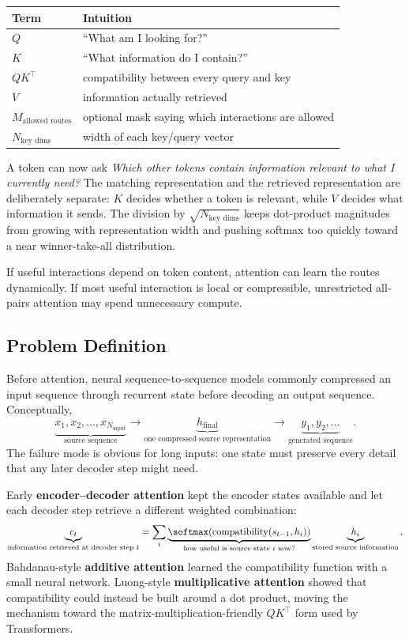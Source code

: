 \begin{center}
\small
\begin{tabularx}{.92\linewidth}{@{}L{.18\linewidth}Y@{}}
\toprule
\textbf{Term} & \textbf{Intuition} \\
\midrule
$Q$ & ``What am I looking for?'' \\
$K$ & ``What information do I contain?'' \\
$QK^\top$ & compatibility between every query and key \\
$V$ & information actually retrieved \\
$M_{\text{allowed routes}}$ & optional mask saying which interactions are allowed \\
$N_{\text{key dims}}$ & width of each key/query vector \\
\bottomrule
\end{tabularx}
\end{center}
A token can now ask \textit{Which other tokens contain information relevant to what I currently need?}
The matching representation and the retrieved representation are deliberately separate: $K$ decides whether a token is relevant, while $V$ decides what information it sends.
The division by $\sqrt{N_{\text{key dims}}}$ keeps dot-product magnitudes from growing with representation width and pushing softmax too quickly toward a near winner-take-all distribution.

\begin{calloutbias}
If useful interactions depend on token content, attention can learn the routes dynamically.
If most useful interaction is local or compressible, unrestricted all-pairs attention may spend unnecessary compute.
\end{calloutbias}

\subsection{Problem Definition}
Before attention, neural sequence-to-sequence models commonly compressed an input sequence through recurrent state before decoding an output sequence.
Conceptually,
\[
\underbrace{x_1,x_2,\ldots,x_{N_{\text{input}}}}_{\text{source sequence}}
\longrightarrow
\underbrace{h_{\text{final}}}_{\text{one compressed source representation}}
\longrightarrow
\underbrace{y_1,y_2,\ldots}_{\text{generated sequence}}.
\]
The failure mode is obvious for long inputs: one state must preserve every detail that any later decoder step might need.

Early \textbf{encoder--decoder attention} kept the encoder states available and let each decoder step retrieve a different weighted combination:
\[
\underbrace{c_t}_{\text{information retrieved at decoder step }t}
=
\sum_i
\underbrace{
\softmax\!\left(
\operatorname{compatibility}(s_{t-1},h_i)
\right)
}_{\text{how useful is source state }i\text{ now?}}
\underbrace{h_i}_{\text{stored source information}}.
\]
Bahdanau-style \textbf{additive attention} learned the compatibility function with a small neural network.
Luong-style \textbf{multiplicative attention} showed that compatibility could instead be built around a dot product, moving the mechanism toward the matrix-multiplication-friendly $QK^\top$ form used by Transformers.

